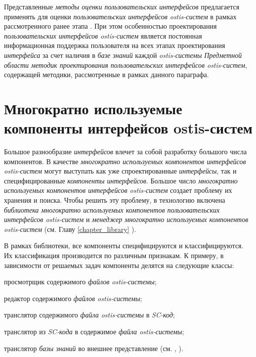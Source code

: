 {Представленные \textit{методы оценки пользовательских интерфейсов} предлагается применять для оценки \textit{пользовательских интерфейсов ostis-систем} в рамках рассмотренного ранее этапа . При этом особенностью проектирования \textit{пользовательских интерфейсов ostis-систем} является постоянная информационная поддержка пользователя на всех этапах проектирования \textit{интерфейса} за счет наличия в \textit{базе знаний} каждой \textit{ostis-системы} \textit{Предметной области методик проектирования пользовательских интерфейсов ostis-систем}, содержащей методики, рассмотренные в рамках данного параграфа.


\section{Многократно используемые компоненты интерфейсов ostis-систем}
\label{sec_reusable_UI_components}

Большое разнообразие \textit{интерфейсов} влечет за собой разработку большого числа компонентов. В качестве \textit{многократно используемых компонентов интерфейсов ostis-систем} могут выступать как уже спроектированные
\textit{интерфейсы}, так и специфицированные \textit{компоненты интерфейсов}. Большое число \textit{многократно используемых компонентов интерфейсов ostis-систем} создает проблему их хранения и поиска. Чтобы решить эту проблему, в технологию включена \textit{библиотека многократно используемых компонентов пользовательских интерфейсов ostis-систем} и \textit{менеджер многократно используемых компонентов ostis-систем} (см. Главу \ref{chapter_library} ).

В рамках библиотеки, все компоненты специфицируются и классифицируются. Их классификация производится по различным признакам. К примеру, в зависимости от решаемых задач компоненты делятся на следующие классы:

\begin{textitemize}
	\item просмотрщик содержимого \textit{файлов ostis-системы};
	\item редактор содержимого \textit{файлов ostis-системы};
	\item транслятор содержимого \textit{файла ostis-системы} в \textit{SC-код};
	\item транслятор из \textit{SC-кода} в содержимое \textit{файла ostis-системы};
	\item транслятор \textit{базы знаний} во внешнее представление (см. , ).
\end{textitemize}

}
